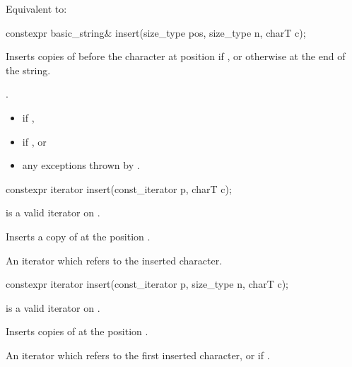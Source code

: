 \begin{itemdescr}
\pnum
\effects
Equivalent to: 
\end{itemdescr}

%
\begin{itemdecl}
constexpr basic_string& insert(size_type pos, size_type n, charT c);
\end{itemdecl}

\begin{itemdescr}
\pnum
\effects
Inserts  copies of  before the character at position 
if ,
or otherwise at the end of the string.

\pnum
\returns
{}.

\pnum
\throws
\begin{itemize}
\item {} if ,
\item {} if , or
\item any exceptions thrown by .
\end{itemize}
\end{itemdescr}

%
\begin{itemdecl}
constexpr iterator insert(const_iterator p, charT c);
\end{itemdecl}

\begin{itemdescr}
\pnum
\expects
{} is a valid iterator on
.

\pnum
\effects
Inserts a copy of  at the position .

\pnum
\returns
An iterator which refers to the inserted character.
\end{itemdescr}

%
\begin{itemdecl}
constexpr iterator insert(const_iterator p, size_type n, charT c);
\end{itemdecl}

\begin{itemdescr}
\pnum
\expects
{} is a valid iterator on
.

\pnum
\effects
Inserts  copies of  at the position .

\pnum
\returns
An iterator which refers to  the first inserted character, or
 if .
\end{itemdescr}


